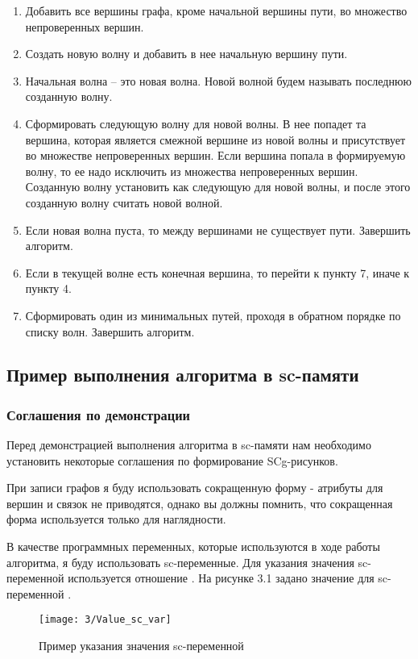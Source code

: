 \begin{enumerate}
\item Добавить все вершины графа, кроме начальной вершины пути, во
  множество непроверенных вершин.
\item Создать новую волну и добавить в нее начальную вершину пути.
\item Начальная волна – это новая волна. Новой волной будем называть
  последнюю созданную волну.
\item Сформировать следующую волну для новой волны. В нее попадет та
  вершина, которая является смежной вершине из новой волны и
  присутствует во множестве непроверенных вершин. Если вершина попала
  в формируемую волну, то ее надо исключить из множества непроверенных
  вершин. Созданную волну установить как следующую для новой волны, и
  после этого созданную волну считать новой волной.
\item Если новая волна пуста, то между вершинами не существует
  пути. Завершить алгоритм.
\item Если в текущей волне есть конечная вершина, то перейти к пункту
  7, иначе к пункту 4.
\item Сформировать один из минимальных путей, проходя в обратном
  порядке по списку волн. Завершить алгоритм.
\end{enumerate}

\subsection{Пример выполнения алгоритма в sc-памяти}

\subsubsection{Соглашения по демонстрации}

Перед демонстрацией выполнения алгоритма в sc-памяти нам необходимо
установить некоторые соглашения по формирование SCg-рисунков.

При записи графов я буду использовать сокращенную форму - атрибуты для
вершин и связок не приводятся, однако вы должны помнить, что
сокращенная форма используется только для наглядности.

В качестве программных переменных, которые используются в ходе работы
алгоритма, я буду использовать sc-переменные. Для указания значения
sc-переменной используется отношение .  На рисунке 3.1
задано значение для sc-переменной .

\begin{figure}[h!]
  \centering
  \texttt{[image: 3/Value\_sc\_var]}
  \caption{Пример указания значения sc-переменной }
  \label{fig:Value_sc_var}
\end{figure}

